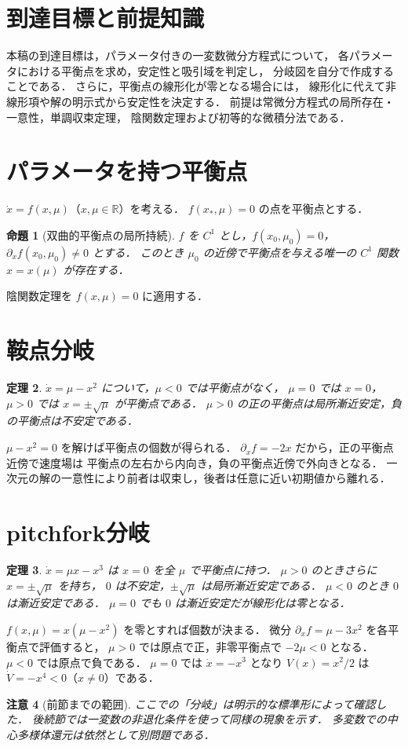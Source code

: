 \documentclass[a5paper,10pt,onecolumn]{jsarticle}
\makeatletter
\theoremstyle{mathnotetheorem}
\newtheorem{theorem}{定理}[section]
\newtheorem{proposition}[theorem]{命題}
\newtheorem{remark}[theorem]{注意}
\renewcommand{\proofname}{証明}
\renewenvironment{proof}[1][\proofname]{%
  \par\pushQED{\qed}\normalfont\topsep4\p@\@plus2\p@\relax
  \trivlist\item[\hskip\labelsep\bfseries #1]\ignorespaces
}{\popQED\endtrivlist\@endpefalse}
\makeatother
\begin{document}
\section*{到達目標と前提知識}
本稿の到達目標は，パラメータ付きの一変数微分方程式について，
各パラメータにおける平衡点を求め，安定性と吸引域を判定し，
分岐図を自分で作成することである．
さらに，平衡点の線形化が零となる場合には，
線形化に代えて非線形項や解の明示式から安定性を決定する．
前提は常微分方程式の局所存在・一意性，単調収束定理，
陰関数定理および初等的な微積分法である．

\section{パラメータを持つ平衡点}
$\dot x=f(x,\mu)$（$x,\mu\in\mathbb R$）を考える．
$f(x_*,\mu)=0$ の点を平衡点とする．
\begin{proposition}[双曲的平衡点の局所持続]
$f$ を $C^1$ とし，$f(x_0,\mu_0)=0$，
$\partial_xf(x_0,\mu_0)\ne0$ とする．
このとき $\mu_0$ の近傍で平衡点を与える唯一の $C^1$ 関数
$x=x(\mu)$ が存在する．
\end{proposition}
\begin{proof}
陰関数定理を $f(x,\mu)=0$ に適用する．
\end{proof}
\section{鞍点分岐}
\begin{theorem}
$\dot x=\mu-x^2$ について，$\mu<0$ では平衡点がなく，
$\mu=0$ では $x=0$，$\mu>0$ では $x=\pm\sqrt\mu$ が平衡点である．
$\mu>0$ の正の平衡点は局所漸近安定，負の平衡点は不安定である．
\end{theorem}
\begin{proof}
$\mu-x^2=0$ を解けば平衡点の個数が得られる．
$\partial_xf=-2x$ だから，正の平衡点近傍で速度場は
平衡点の左右から内向き，負の平衡点近傍で外向きとなる．
一次元の解の一意性により前者は収束し，後者は任意に近い初期値から離れる．
\end{proof}
\section{pitchfork分岐}
\begin{theorem}
$\dot x=\mu x-x^3$ は $x=0$ を全 $\mu$ で平衡点に持つ．
$\mu>0$ のときさらに $x=\pm\sqrt\mu$ を持ち，
$0$ は不安定，$\pm\sqrt\mu$ は局所漸近安定である．
$\mu<0$ のとき $0$ は漸近安定である．
$\mu=0$ でも $0$ は漸近安定だが線形化は零となる．
\end{theorem}
\begin{proof}
$f(x,\mu)=x(\mu-x^2)$ を零とすれば個数が決まる．
微分 $\partial_xf=\mu-3x^2$ を各平衡点で評価すると，
$\mu>0$ では原点で正，非零平衡点で $-2\mu<0$ となる．
$\mu<0$ では原点で負である．
$\mu=0$ では $\dot x=-x^3$ となり
$V(x)=x^2/2$ は $\dot V=-x^4<0$（$x\ne0$）である．
\end{proof}
\begin{remark}[前節までの範囲]
ここでの「分岐」は明示的な標準形によって確認した．
後続節では一変数の非退化条件を使って同様の現象を示す．
多変数での中心多様体還元は依然として別問題である．
\end{remark}
\end{document}
